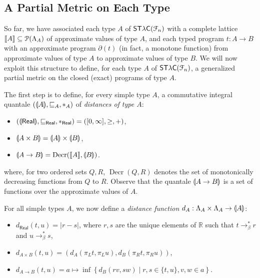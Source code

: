 \subsection{A Partial Metric on Each Type}
\label{subsection:type-gpms}

So far, we have associated each type $A$ of $\mathsf{ST\lambda C}(\mathcal F_{n})$ with a complete lattice $\llbracket A \rrbracket\subseteq \mathcal P(\Lambda_{A})$ of approximate values of type $A$, and each typed program $t:A\to B$ with an approximate program $\partial(t)$ (in fact, a monotone function) from approximate values of type $A$ to approximate values of type $B$.
We will now exploit this structure to define, for each type $A$ of $\mathsf{ST\lambda C}(\mathcal F_{n})$, a generalized partial metric on the closed (exact) programs of type $A$. %



The first step is to define, for every simple type $A$, a commutative integral quantale $(\llparenthesis A \rrparenthesis, \sqsubseteq_A, \mathbin{\ast}_A)$ of \emph{distances of type $A$}:
\begin{itemize}
\item $(\llparenthesis \mathsf{Real} \rrparenthesis, \sqsubseteq_\mathsf{Real}, \mathbin{\ast}_\mathsf{Real}) = ([0,\infty], \geq, +)$,
\item $\llparenthesis A \times B \rrparenthesis = \llparenthesis A \rrparenthesis \times \llparenthesis B \rrparenthesis$,
\item $\llparenthesis A \to B \rrparenthesis =\operatorname{Decr}(\llbracket A \rrbracket, \llparenthesis B \rrparenthesis)$.
\end{itemize}
where, for two ordered sets $Q,R$, $\operatorname{Decr}(Q,R)$ denotes the set of monotonically decreasing functions from $Q$ to $R$.
Observe that the quantale $\llparenthesis A\to B \rrparenthesis$ is a set of functions over the approximate values of $A$.

For all simple types $A$, we now define a \emph{distance function} $d_A : \Lambda_A \times \Lambda_A \to \llparenthesis A \rrparenthesis$:
\begin{itemize}
\item $d_\mathsf{Real}(t,u) = \left\vert r-s \right\vert$, where $r,s$ are the unique elements of $\mathbb{R}$ such that $t \to_\beta^* r$ and $u \to_\beta^* s$,
\item $d_{A \times B}(t,u) = (d_A(\pi_L t, \pi_L u), d_B(\pi_R t, \pi_R u))$,
\item $d_{A \to B}(t,u) = a \mapsto \inf \left\{ d_B(rv, sw) \mid r,s \in \{t,u\}, v,w \in a \right\}$.
\end{itemize}

